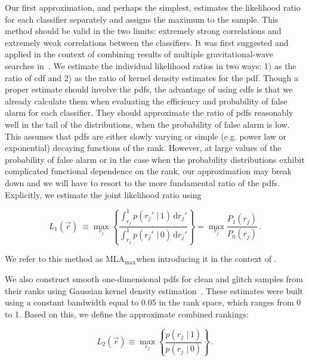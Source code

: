 \documentclass[prd, twocolumn, lengthcheck, superscriptaddress, showpacs, letterpaper, nofootinbib]{revtex4-1}
\newcommand\given{\,\,|\,}
\newcommand\vecrank{\vec{r}}
\newcommand\MLAmax{\ac{MLA}${}_{\mathrm{max}}$}
\newcommand\diff{\, \mathrm{d}}
\begin{document}
Our first approximation, and perhaps the simplest, estimates the likelihood ratio for each classifier separately and assigns the maximum to the sample. This method should be valid in the two limits: extremely strong correlations and extremely weak correlations between the classifiers. It was first suggested and applied in the context of combining results of multiple gravitational-wave searches in~\cite{Biswas2012b}. We estimate the individual likelihood ratios in two ways: 1) as the ratio of \ac{cdf} and 2) as the ratio of kernel density estimates for the \ac{pdf}. Though a proper estimate should involve the \ac{pdf}s, the advantage of using \ac{cdf}s is that we already calculate them when evaluating the efficiency and probability of false alarm for each classifier. They should approximate the  ratio of \ac{pdf}s reasonably well in the tail of the distributions, when the probability of false alarm is low. This assumes that \ac{pdf}s are either slowly varying or simple (e.g. power law or exponential) decaying functions of the rank. 
However, at large values of the probability of false alarm or in the case when the probability distributions exhibit complicated functional dependence on the rank, our approximation may break down and we will have to resort to the more fundamental ratio of the \ac{pdf}s. Explicitly, we estimate the joint likelihood ratio using 

\begin{equation}
\label{maxcdflr}
L_{1}(\vecrank)\ \equiv \max_{r_j} \left\{\frac{\int_{r_j}^{1} p( r_j' \given 1) \diff r_j'}{\int_{r_j}^{1} p( r_j' \given 0) \diff r_j'}\right\} = \max_{r_j}\frac{P_{1}(r_j)}{P_0(r_j)}\,.
\end{equation}

\noindent We refer to this method as \MLAmax when introducing it in the context of .

We also construct smooth one-dimensional \ac{pdf}s for clean and glitch samples from their ranks using Gaussian kernel density estimation~\cite{wand1995kernel}. These estimates were built using a constant bandwidth equal to 0.05 in the rank space, which ranges from 0 to 1. Based on this, we define the approximate combined rankings: 

\begin{equation}
\label{maxpdflr}
L_{2}(\vecrank) \equiv \max_{r_j} \left\{\frac{p( r_j \given 1)}{p( r_j \given 0)}\right\}\,.
\end{equation}
\end{document}
